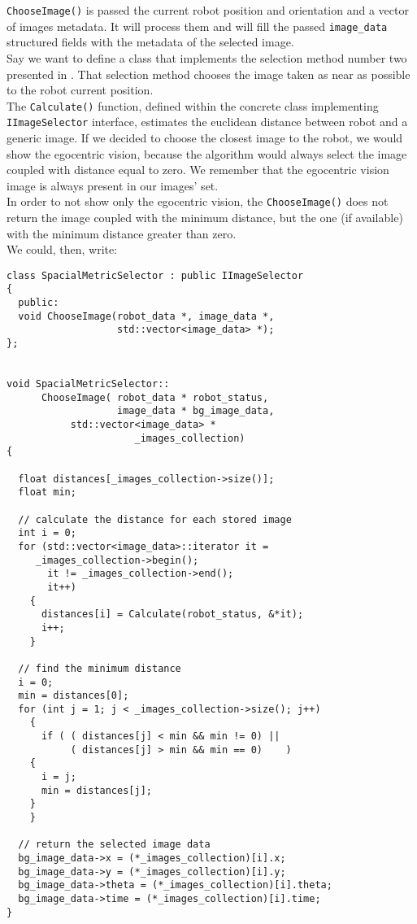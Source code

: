 \texttt{ChooseImage()} is passed the current robot position and
orientation and a vector of images metadata. It will process them 
and will fill the passed \texttt{image\_data} structured fields 
with the metadata of the selected image.
\\
Say we want to define a class that implements the selection 
method number two presented in \cite{sugimoto}. That selection method
chooses the image taken as near as possible to the robot
current position.
\\
The \texttt{Calculate()} function, defined within the concrete class
implementing \texttt{IImageSelector} interface,
estimates the euclidean distance between robot and a generic image.
If we decided to choose the closest image to the robot, we would
show the egocentric vision, because the algorithm would always
select the image coupled with distance equal to zero. We remember
that the egocentric vision image is always present in our images' set.
\\
In order to not show only the egocentric vision, the \texttt{ChooseImage()}
does not return the image coupled with the minimum distance, but the one
(if available) with the minimum distance greater than zero.
\\
We could, then, write:
\\
\begin{lstlisting}[caption={A possible \texttt{ChooseImage} implementation}, label={code:chooseimage_impl}]
class SpacialMetricSelector : public IImageSelector
{
  public:
  void ChooseImage(robot_data *, image_data *, 
                   std::vector<image_data> *);
};


void SpacialMetricSelector::
      ChooseImage( robot_data * robot_status, 
                   image_data * bg_image_data,
		   std::vector<image_data> * 
                      _images_collection)
{

  float distances[_images_collection->size()];
  float min;

  // calculate the distance for each stored image
  int i = 0;
  for (std::vector<image_data>::iterator it =
	 _images_collection->begin();
       it != _images_collection->end();
       it++)
    {
      distances[i] = Calculate(robot_status, &*it);
      i++;
    }

  // find the minimum distance
  i = 0;
  min = distances[0];
  for (int j = 1; j < _images_collection->size(); j++)
    {
      if ( ( distances[j] < min && min != 0) || 
           ( distances[j] > min && min == 0)    )
	{
	  i = j;
	  min = distances[j];
	}
    }

  // return the selected image data
  bg_image_data->x = (*_images_collection)[i].x;
  bg_image_data->y = (*_images_collection)[i].y;
  bg_image_data->theta = (*_images_collection)[i].theta;
  bg_image_data->time = (*_images_collection)[i].time;
}
\end{lstlisting}
